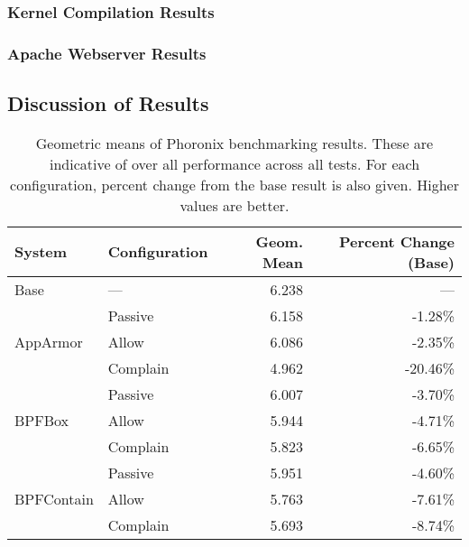 \subsubsection{Kernel Compilation Results}

\subsubsection{Apache Webserver Results}

\subsection{Discussion of Results}%
\label{ss:eval-performance-discussion}

\begin{table}[htbp]
  \centering
  \caption[Geometric means of Phoronix benchmarking results]{
    Geometric means of Phoronix benchmarking results.  These are indicative of over all
    performance across all tests.  For each configuration, percent change from the base
    result is also given.  Higher values are better.
  }%
  \label{tab:phoronix-geometric}
  \begin{tabular}{llrr}
  \toprule
  System                        & Configuration & Geom. Mean & Percent Change (Base)\\
  \midrule
  Base                          & ---           & 6.238          & --- \\
  \midrule
  \multirow{3}{*}{AppArmor}     & Passive       & 6.158          &  -1.28\% \\
                                & Allow         & 6.086          &  -2.35\% \\
                                & Complain      & 4.962          & -20.46\% \\
  \midrule
  \multirow{3}{*}{BPFBox}       & Passive       & 6.007          & -3.70\% \\
                                & Allow         & 5.944          & -4.71\% \\
                                & Complain      & 5.823          & -6.65\% \\
  \midrule
  \multirow{3}{*}{BPFContain}   & Passive       & 5.951          & -4.60\% \\
                                & Allow         & 5.763          & -7.61\% \\
                                & Complain      & 5.693          & -8.74\% \\
  \bottomrule
  \end{tabular}
\end{table}

